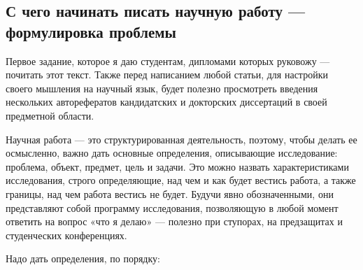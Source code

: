 \documentclass{report}
\begin{document}
\subsection{С чего начинать писать научную работу — формулировка проблемы}
Первое задание, которое я даю студентам, дипломами которых руковожу — почитать этот текст. Также перед написанием любой статьи, для настройки своего мышления на научный язык, будет полезно просмотреть введения нескольких
авторефератов кандидатских и докторских диссертаций в своей предметной области.

Научная работа — это структурированная деятельность, поэтому, чтобы делать ее осмысленно, важно дать основные определения, описывающие исследование: проблема, объект, предмет, цель и задачи. Это можно назвать характеристиками исследования, строго определяющие, над чем и как будет вестись работа, а также границы, над чем работа вестись не будет. Будучи явно обозначенными, они представляют собой программу исследования, позволяющую в любой момент ответить на вопрос «что я делаю» — полезно при ступорах, на предзащитах и студенческих конференциях.

Надо дать определения, по порядку:
\end{document}
